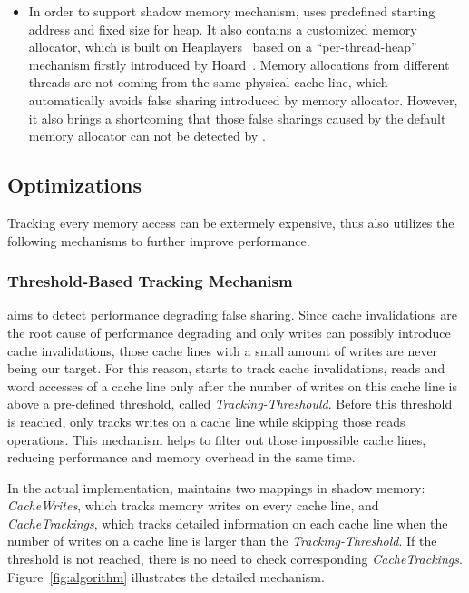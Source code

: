 \begin{itemize}
\item
In order to support shadow memory mechanism, \Predator{} uses predefined starting address and 
fixed size for heap. It also contains a customized memory allocator, which is built on 
Heaplayers~\cite{heaplayers} based on a ``per-thread-heap'' mechanism firstly introduced 
by Hoard~\cite{Hoard}. Memory allocations from different threads 
are not coming from the same physical cache line, which automatically avoids false sharing 
introduced by memory allocator.
However, it also brings a shortcoming that those false sharings caused by the default memory 
allocator can not be detected by \Predator{}. 

\end{itemize} 
 
\subsection{Optimizations}
\label{optimization}
Tracking every memory access can be extermely expensive, thus 
\Predator{} also utilizes the following mechanisms to further improve performance.

\subsubsection{Threshold-Based Tracking Mechanism}
\label{sec:thresholdtracking}
\Predator{} aims to detect performance degrading false sharing.
Since cache invalidations are the root cause of performance degrading and only writes 
can possibly introduce cache invalidations, 
those cache lines with a small amount of writes are never being our target.
For this reason, \Predator{} starts to track cache invalidations, reads and word accesses 
of a cache line only after the number of writes on this cache line is above a
pre-defined threshold, called {\it Tracking-Threshould}. 
Before this threshold is reached, \Predator{} only tracks writes on a cache line 
while skipping those reads operations. 
This mechanism helps to filter out
those impossible cache lines, reducing performance and memory overhead
in the same time.

In the actual implementation, \Predator{} maintains two mappings in shadow memory: 
{\it CacheWrites}, which tracks memory writes on every cache line, 
and {\it CacheTrackings}, which tracks detailed information 
on each cache line when the number of writes on a cache line is larger than
the {\it Tracking-Threshold}. 
If the threshold is not reached, there is no need to check corresponding {\it CacheTrackings}. 
Figure~\ref{fig:algorithm} illustrates the detailed mechanism.

